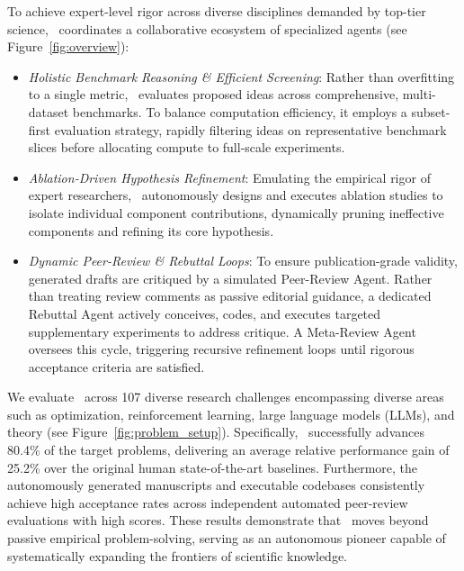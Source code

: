 
% 
To achieve expert-level rigor across diverse disciplines demanded by top-tier science, \sname~coordinates a collaborative ecosystem of specialized agents (see Figure~\ref{fig:overview}):
\begin{itemize}
    \item \emph{Holistic Benchmark Reasoning \& Efficient Screening}: Rather than overfitting to a single metric, \sname~evaluates proposed ideas across comprehensive, multi-dataset benchmarks. To balance computation efficiency, it employs a subset-first evaluation strategy, rapidly filtering ideas on representative benchmark slices before allocating compute to full-scale experiments.
    \item \emph{Ablation-Driven Hypothesis Refinement}: Emulating the empirical rigor of expert researchers, \sname~autonomously designs and executes ablation studies to isolate individual component contributions, dynamically pruning ineffective components and refining its core hypothesis.
    \item \emph{Dynamic Peer-Review \& Rebuttal Loops}: To ensure publication-grade validity, generated drafts are critiqued by a simulated Peer-Review Agent. Rather than treating review comments as passive editorial guidance, a dedicated Rebuttal Agent actively conceives, codes, and executes targeted supplementary experiments to address critique. A Meta-Review Agent oversees this cycle, triggering recursive refinement loops until rigorous acceptance criteria are satisfied.
\end{itemize}

We evaluate \sname~across 107 diverse research challenges encompassing diverse areas such as optimization, reinforcement learning, large language models (LLMs), and theory (see Figure~\ref{fig:problem_setup}). Specifically, \sname~successfully advances 80.4\% of the target problems, delivering an average relative performance gain of 25.2\% over the original human state-of-the-art baselines. Furthermore, the autonomously generated manuscripts and executable codebases consistently achieve high acceptance rates across independent automated peer-review evaluations with high scores. These results demonstrate that \sname~moves beyond passive empirical problem-solving, serving as an autonomous pioneer capable of systematically expanding the frontiers of scientific knowledge.